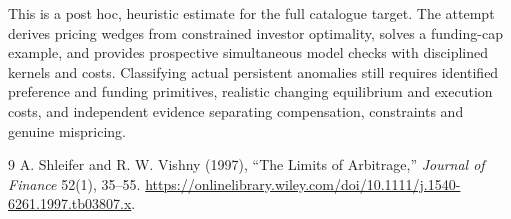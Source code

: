 \documentclass[11pt]{article}
\theoremstyle{definition}
\begin{document}
This is a post hoc, heuristic estimate for the full catalogue target.
The attempt derives pricing wedges from constrained investor optimality, solves a funding-cap example, and provides prospective simultaneous model checks with disciplined kernels and costs. Classifying actual persistent anomalies still requires identified preference and funding primitives, realistic changing equilibrium and execution costs, and independent evidence separating compensation, constraints and genuine mispricing.

\begin{thebibliography}{9}
 A. Shleifer and R. W. Vishny (1997), ``The Limits of Arbitrage,'' \emph{Journal of Finance} 52(1), 35--55. \url{https://onlinelibrary.wiley.com/doi/10.1111/j.1540-6261.1997.tb03807.x}.
\end{thebibliography}
\end{document}
